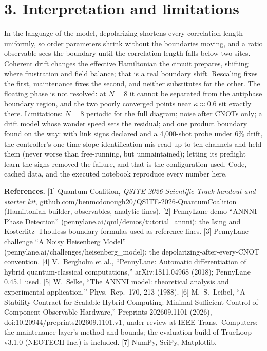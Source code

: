 \documentclass[10pt,letterpaper]{article}
\begin{document}
\section*{3. Interpretation and limitations}
In the language of the model, depolarizing shortens every correlation length uniformly, so order parameters shrink without the boundaries moving, and a ratio observable sees the boundary until the correlation length falls below two sites. Coherent drift changes the effective Hamiltonian the circuit prepares, shifting where frustration and field balance; that is a real boundary shift. Rescaling fixes the first, maintenance fixes the second, and neither substitutes for the other. The floating phase is not resolved: at $N=8$ it cannot be separated from the antiphase boundary region, and the two poorly converged points near $\kappa\approx0.6$ sit exactly there. Limitations: $N=8$ periodic for the full diagram; noise after CNOTs only; a drift model whose wander speed sets the residual; and one product boundary found on the way: with link signs declared and a 4,000-shot probe under 6\% drift, the controller's one-time slope identification mis-read up to ten channels and held them (never worse than free-running, but unmaintained); letting its preflight learn the signs removed the failure, and that is the configuration used. Code, cached data, and the executed notebook reproduce every number here.

\vspace{2pt}\scriptsize\textbf{References.} [1] Quantum Coalition, \emph{QSITE 2026 Scientific Track handout and starter kit}, github.com/benmcdonough20/QSITE-2026-QuantumCoalition (Hamiltonian builder, observables, analytic lines). [2] PennyLane demo ``ANNNI Phase Detection'' (pennylane.ai/qml/demos/tutorial\_annni): the Ising and Kosterlitz--Thouless boundary formulas used as reference lines. [3] PennyLane challenge ``A Noisy Heisenberg Model'' (pennylane.ai/challenges/heisenberg\_model): the depolarizing-after-every-CNOT convention. [4] V.~Bergholm et al., ``PennyLane: Automatic differentiation of hybrid quantum-classical computations,'' arXiv:1811.04968 (2018); PennyLane 0.45.1 used. [5] W.~Selke, ``The ANNNI model: theoretical analysis and experimental application,'' Phys.\ Rep.\ 170, 213 (1988). [6] M.~S.~Leibel, ``A Stability Contract for Scalable Hybrid Computing: Minimal Sufficient Control of Component-Observable Hardware,'' Preprints 202609.1101 (2026), doi:10.20944/preprints202609.1101.v1, under review at IEEE Trans.\ Computers: the maintenance layer's method and bounds; the evaluation build of TrueLoop v3.1.0 (NEOTECH Inc.) is included. [7] NumPy, SciPy, Matplotlib.
\end{document}
